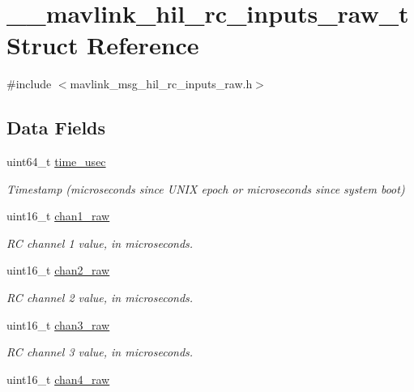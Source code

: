 \hypertarget{struct____mavlink__hil__rc__inputs__raw__t}{\section{\+\_\+\+\_\+mavlink\+\_\+hil\+\_\+rc\+\_\+inputs\+\_\+raw\+\_\+t Struct Reference}
\label{struct____mavlink__hil__rc__inputs__raw__t}
}


{\ttfamily \#include $<$mavlink\+\_\+msg\+\_\+hil\+\_\+rc\+\_\+inputs\+\_\+raw.\+h$>$}

\subsection*{Data Fields}
\begin{DoxyCompactItemize}
\item 
uint64\+\_\+t \hyperlink{struct____mavlink__hil__rc__inputs__raw__t_a17665e54cab99a69ff2e6d3b8ae63928}{time\+\_\+usec}
\begin{DoxyCompactList}\small\item\em Timestamp (microseconds since U\+N\+I\+X epoch or microseconds since system boot) \end{DoxyCompactList}\item 
uint16\+\_\+t \hyperlink{struct____mavlink__hil__rc__inputs__raw__t_a1c71d0b0abbff7055c0753a8b8a116bc}{chan1\+\_\+raw}
\begin{DoxyCompactList}\small\item\em R\+C channel 1 value, in microseconds. \end{DoxyCompactList}\item 
uint16\+\_\+t \hyperlink{struct____mavlink__hil__rc__inputs__raw__t_a0210c7a3752c816e694c38e9fa85b8ed}{chan2\+\_\+raw}
\begin{DoxyCompactList}\small\item\em R\+C channel 2 value, in microseconds. \end{DoxyCompactList}\item 
uint16\+\_\+t \hyperlink{struct____mavlink__hil__rc__inputs__raw__t_a4f05c2ed52ec8aed527bc31331f74247}{chan3\+\_\+raw}
\begin{DoxyCompactList}\small\item\em R\+C channel 3 value, in microseconds. \end{DoxyCompactList}\item 
uint16\+\_\+t \hyperlink{struct____mavlink__hil__rc__inputs__raw__t_a762888a4e5d0273d9042bd1924c8b95b}{chan4\+\_\+raw}

\end{DoxyCompactItemize}
